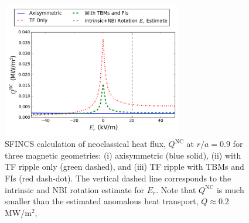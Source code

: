 \documentclass[aip, pop, preprint]{revtex4-1}
\numberwithin{figure}{section}
\numberwithin{equation}{section}
\begin{document}
\begin{figure}[h!]
\centering
\includegraphics[width=0.7\textwidth]
{HeatFlux.png}
\caption{\label{fig:HeatFlux} SFINCS calculation of neoclassical heat flux, $Q^{\text{NC}}$ at $r/a = 0.9$ for three magnetic geometries: (i) axisymmetric (blue solid), (ii) with TF ripple only (green dashed), and (iii) TF ripple with TBMs and FIs (red dash-dot). The vertical dashed line corresponds to the intrinsic and NBI rotation estimate for $E_r$. Note that $Q^{\text{NC}}$ is much smaller than the estimated anomalous heat transport, $Q\approx 0.2$ MW/m$^2$,}
\end{figure}

\FloatBarrier
\end{document}
